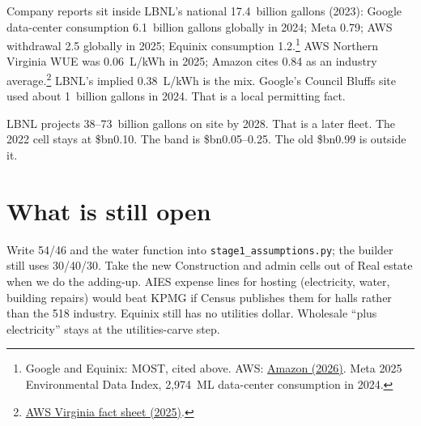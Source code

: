 \documentclass[11pt]{article}
\newcommand{\bn}{\$bn}
\begin{document}
Company reports sit inside LBNL's national 17.4~billion gallons (2023): Google data-center consumption 6.1~billion gallons globally in 2024; Meta 0.79; AWS withdrawal 2.5 globally in 2025; Equinix consumption 1.2.\footnote{Google and Equinix: MOST, cited above. AWS: \href{https://www.aboutamazon.com/news/sustainability/amazon-data-center-water-usage}{Amazon (2026)}. Meta 2025 Environmental Data Index, 2{,}974~ML data-center consumption in 2024.} AWS Northern Virginia WUE was 0.06~L/kWh in 2025; Amazon cites 0.84 as an industry average.\footnote{\href{https://sustainability.aboutamazon.com/aws-sustainability-fact-sheets/aws-fact-sheet-virginia.pdf}{AWS Virginia fact sheet (2025)}.} LBNL's implied 0.38~L/kWh is the mix. Google's Council Bluffs site used about 1~billion gallons in 2024. That is a local permitting fact.

LBNL projects 38--73~billion gallons on site by 2028. That is a later fleet. The 2022 cell stays at \bn0.10. The band is \bn0.05--0.25. The old \bn0.99 is outside it.

\section{What is still open}

Write 54/46 and the water function into \texttt{stage1\_assumptions.py}; the builder still uses 30/40/30. Take the new Construction and admin cells out of Real estate when we do the adding-up. AIES expense lines for hosting (electricity, water, building repairs) would beat KPMG if Census publishes them for halls rather than the 518 industry. Equinix still has no utilities dollar. Wholesale ``plus electricity'' stays at the utilities-carve step.
\end{document}
